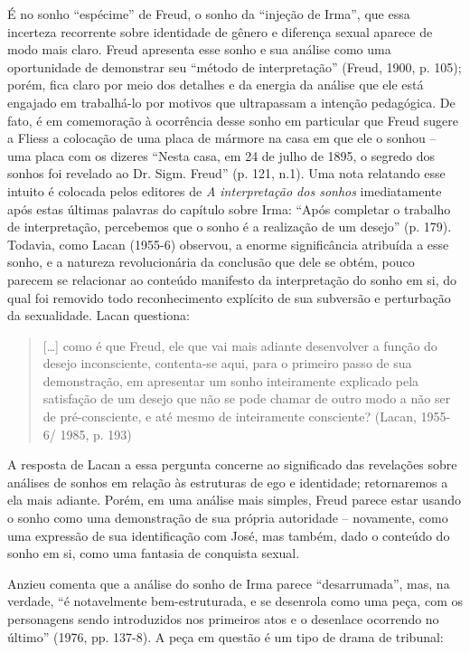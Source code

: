 É no sonho ``espécime'' de Freud, o sonho da ``injeção de Irma'', que
essa incerteza recorrente sobre identidade de gênero e diferença sexual
aparece de modo mais claro. Freud apresenta esse sonho e sua análise
como uma oportunidade de demonstrar seu ``método de interpretação''
(Freud, 1900, p. 105); porém, fica claro por meio dos detalhes e da
energia da análise que ele está engajado em trabalhá-lo por motivos que
ultrapassam a intenção pedagógica. De fato, é em comemoração à
ocorrência desse sonho em particular que Freud sugere a Fliess a
colocação de uma placa de mármore na casa em que ele o sonhou -- uma
placa com os dizeres ``Nesta casa, em 24 de julho de 1895, o segredo dos
sonhos foi revelado ao Dr. Sigm. Freud'' (p. 121, n.1). Uma nota
relatando esse intuito é colocada pelos editores de \emph{A
interpretação dos sonhos} imediatamente após estas últimas palavras do
capítulo sobre Irma: ``Após completar o trabalho de interpretação,
percebemos que o sonho é a realização de um desejo'' (p. 179). Todavia,
como Lacan (1955-6) observou, a enorme significância atribuída a esse
sonho, e a natureza revolucionária da conclusão que dele se obtém, pouco
parecem se relacionar ao conteúdo manifesto da interpretação do sonho em
si, do qual foi removido todo reconhecimento explícito de sua subversão
e perturbação da sexualidade. Lacan questiona:

\begin{quote}
{[}\ldots{}{]} como é que Freud, ele que vai mais adiante desenvolver a
função do desejo inconsciente, contenta-se aqui, para o primeiro passo
de sua demonstração, em apresentar um sonho inteiramente explicado pela
satisfação de um desejo que não se pode chamar de outro modo a não ser
de pré-consciente, e até mesmo de inteiramente consciente? (Lacan,
1955-6/ 1985, p. 193)
\end{quote}

A resposta de Lacan a essa pergunta concerne ao significado das
revelações sobre análises de sonhos em relação às estruturas de ego e
identidade; retornaremos a ela mais adiante. Porém, em uma análise mais
simples, Freud parece estar usando o sonho como uma demonstração de sua
própria autoridade -- novamente, como uma expressão de sua identificação
com José, mas também, dado o conteúdo do sonho em si, como uma fantasia
de conquista sexual.

Anzieu comenta que a análise do sonho de Irma parece ``desarrumada'',
mas, na verdade, ``é notavelmente bem-estruturada, e se desenrola como
uma peça, com os personagens sendo introduzidos nos primeiros atos e o
desenlace ocorrendo no último'' (1976, pp. 137-8). A peça em questão é
um tipo de drama de tribunal:

